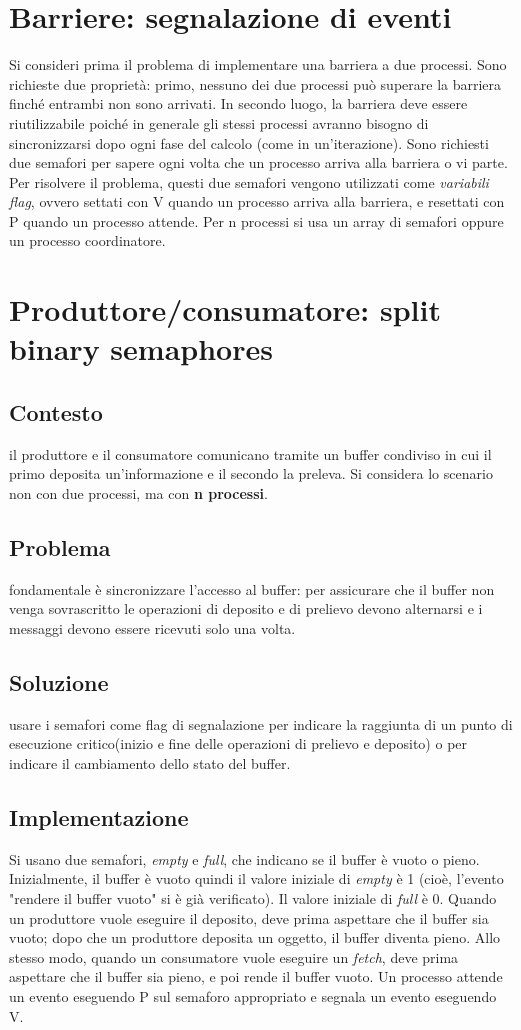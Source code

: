 \documentclass[10pt,a4paper]{book}
\begin{document}
\section{Barriere: segnalazione di eventi}
Si consideri prima il problema di implementare una barriera a due processi. Sono richieste due proprietà: primo, nessuno dei due processi può superare la barriera finché entrambi non sono arrivati. In secondo luogo, la barriera deve essere riutilizzabile poiché in generale gli stessi processi avranno bisogno di sincronizzarsi dopo ogni fase del calcolo (come in un'iterazione).
Sono richiesti due semafori per sapere ogni volta che un processo arriva alla barriera o vi parte.
Per risolvere il problema, questi due semafori vengono utilizzati come \textit{variabili flag}, ovvero settati con V quando un processo arriva alla barriera, e resettati con P quando un processo attende.
Per n processi si usa un array di semafori oppure un processo coordinatore.

\section{Produttore/consumatore: split binary semaphores}
\subsection{Contesto} il produttore e il consumatore comunicano tramite un buffer condiviso in cui il primo deposita un'informazione e il secondo la preleva. Si considera lo scenario non con due processi, ma con \textbf{n processi}.
\subsection{Problema} fondamentale è sincronizzare l'accesso al buffer: per assicurare che il buffer non venga sovrascritto le operazioni di deposito e di prelievo devono alternarsi e i messaggi devono essere ricevuti solo una volta.
\subsection{Soluzione} usare i semafori come flag di segnalazione per indicare la raggiunta di un punto di esecuzione critico(inizio e fine delle operazioni di prelievo e deposito) o per indicare il cambiamento dello stato del buffer.
\subsection{Implementazione} Si usano due semafori, \textit{empty} e \textit{full}, che indicano se il buffer è vuoto o pieno. Inizialmente, il buffer è vuoto quindi il valore iniziale di \textit{empty} è 1 (cioè, l'evento "rendere il buffer vuoto" si è già verificato). Il valore iniziale di \textit{full} è 0. Quando un produttore vuole eseguire il deposito, deve prima aspettare che il buffer sia vuoto; dopo che un produttore deposita un oggetto, il buffer diventa pieno. Allo stesso modo, quando un consumatore vuole eseguire un \textit{fetch}, deve prima aspettare che il buffer sia pieno, e poi rende il buffer vuoto. 
Un processo attende un evento eseguendo P sul semaforo appropriato e segnala un evento eseguendo V.
\end{document}
